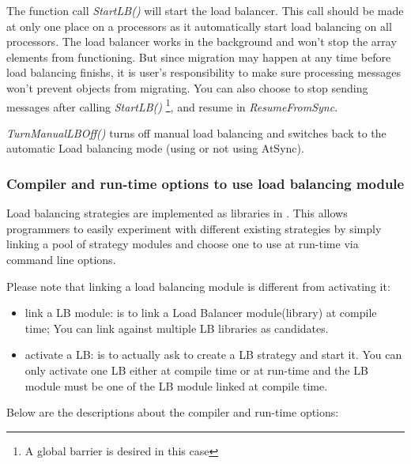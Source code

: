 \begin{enumerate}
The function call {\em StartLB()} will start the load balancer. 
This call should be made at only one place on a processors as it automatically 
start load balancing on all processors. The load balancer works in 
the background and won't stop the array elements from functioning. 
But since migration may happen at any time before load balancing finishs,
it is user's responsibility to make sure processing messages won't 
prevent objects from migrating. You can also choose to stop sending messages 
after calling {\em StartLB()}
\footnote{A global barrier is desired in this case}, and resume 
in {\em ResumeFromSync}.

{\em TurnManualLBOff()} turns off manual load balancing and 
switches back to the automatic Load balancing mode (using or not using AtSync). 

\end{enumerate}


\subsubsection{Compiler and run-time options to use load balancing module}
\label{lbOption}

Load balancing strategies are implemented as libraries in \charmpp{}. This
allows programmers to easily experiment with different existing strategies 
by simply linking a pool of strategy modules and choose 
one to use at run-time via command line options.

Please note that linking a load balancing module is different from activating it:
\begin{itemize}
\item link a LB module: is to link a Load Balancer module(library) at 
   compile time; You can link against multiple LB libraries as candidates.
\item activate a LB: is to actually ask to create a LB strategy and 
   start it. You can only activate one LB either at compile time or at
   run-time and the LB module must be one of the LB module linked at 
   compile time.
\end{itemize}


Below are the descriptions about the compiler and run-time options:

